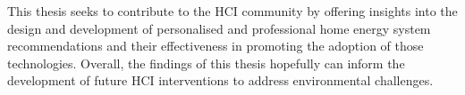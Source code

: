 

This thesis seeks to contribute to the HCI community by offering insights into the design and development of personalised and professional home energy system recommendations and their effectiveness in promoting the adoption of those technologies. 
Overall, the findings of this thesis hopefully can inform the development of future HCI interventions to address environmental challenges. 






